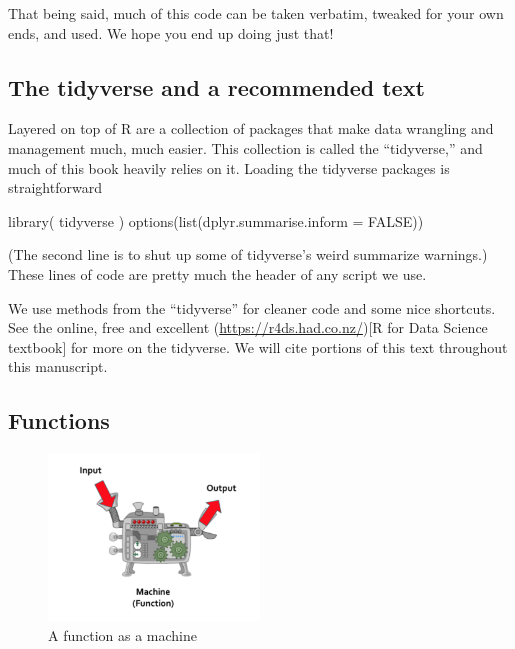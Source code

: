 \documentclass[
]{book}
\newenvironment{Shaded}{\begin{snugshade}}{\end{snugshade}}
\newcommand{\AttributeTok}[1]{\textcolor[rgb]{0.77,0.63,0.00}{#1}}
\newcommand{\ConstantTok}[1]{\textcolor[rgb]{0.00,0.00,0.00}{#1}}
\newcommand{\FunctionTok}[1]{\textcolor[rgb]{0.00,0.00,0.00}{#1}}
\newcommand{\NormalTok}[1]{#1}
\begin{document}
That being said, much of this code can be taken verbatim, tweaked for your own ends, and used.
We hope you end up doing just that!

\hypertarget{the-tidyverse-and-a-recommended-text}{%
\subsection{The tidyverse and a recommended text}\label{the-tidyverse-and-a-recommended-text}}

Layered on top of R are a collection of packages that make data wrangling and management much, much easier.
This collection is called the ``tidyverse,'' and much of this book heavily relies on it.
Loading the tidyverse packages is straightforward

\begin{Shaded}
\begin{Highlighting}[]
\FunctionTok{library}\NormalTok{( tidyverse )}
\FunctionTok{options}\NormalTok{(}\FunctionTok{list}\NormalTok{(}\AttributeTok{dplyr.summarise.inform =} \ConstantTok{FALSE}\NormalTok{))}
\end{Highlighting}
\end{Shaded}

(The second line is to shut up some of tidyverse's weird summarize warnings.)
These lines of code are pretty much the header of any script we use.

We use methods from the ``tidyverse'' for cleaner code and some nice shortcuts.
See the online, free and excellent (\url{https://r4ds.had.co.nz/}){[}R for Data Science textbook{]} for more on the tidyverse.
We will cite portions of this text throughout this manuscript.

\hypertarget{functions}{%
\subsection{Functions}\label{functions}}

\begin{figure}
\centering
\includegraphics[width=0.5\textwidth,height=\textheight]{image/function-machine.png}
\caption{A function as a machine}
\end{figure}
\end{document}
